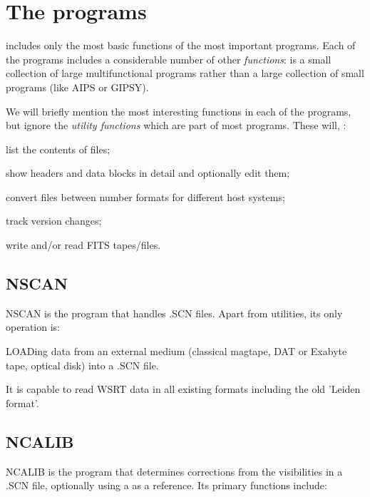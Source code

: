 \section{ The \NEWSTAR programs}
\label{.programs}

	 includes only the most basic functions of the
most important programs. Each of the programs includes a considerable number of
other {\em functions}: \NEWSTAR is a small collection of large multifunctional
programs rather than a large collection of small programs (like AIPS or GIPSY).

	We will briefly mention the most interesting functions in each of the
programs, but ignore the {\em utility functions} which are part of most
programs. These will, \eg:

\bi
\item   list the contents of files;

\item   show headers and data blocks in detail and optionally edit them;

\item   convert files between number formats for different host systems;

\item   track version changes;

\item   write and/or read FITS tapes/files.

\ei


\subsection{ NSCAN}
\label{.nscan}

	NSCAN is the program that handles .SCN files. Apart from utilities, its
only operation is:

\bi
\item   LOADing data from an external medium (classical magtape, DAT or Exabyte
tape, optical disk) into a .SCN file.
\ei

It is capable to read WSRT data in all existing formats including the old
'Leiden format'.


\subsection{ NCALIB}
\label{.ncalib}

	NCALIB is the program that determines corrections from the visibilities
in a .SCN file, optionally using a  as a
reference. Its primary functions include:

